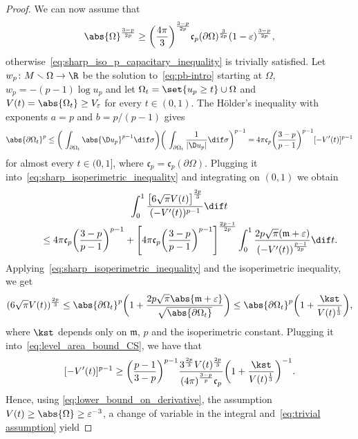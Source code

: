 \documentclass[10pt,a4paper]{amsart}
\numberwithin{equation}{section}
\renewcommand{\ncapa}{\mathfrak{c}}
\newcommand{\ma}{\mathfrak{m}}
\begin{document}
\begin{proof}
We can now assume that
\begin{equation}\label{eq:trivial assumption}
 \abs{\Omega}^{\frac{3-p}{2p}} \geq \bigg(\frac{4 \pi}{3}\bigg)^{\frac{3-p}{2p}}\ncapa_p(\partial \Omega)^{\frac{3}{2p}}(1-\varepsilon)^{\frac{3-p}{2p}},
\end{equation}
otherwise~\eqref{eq:sharp_iso_p_capacitary_inequality} is trivially satisfied. Let $w_p\colon M \smallsetminus \Omega \to \R$ be the solution to~\eqref{eq:pb-intro} starting at $\Omega$, $w_p = -(p-1) \log u_p$ and let $\Omega_t=\set{u_p\geq t}\cup \Omega $ and $V(t)= \abs{ \Omega_t}\geq V_\varepsilon$ for every $t \in (0,1)$. The H\"{o}lder's inequality with exponents $a=p$ and $b=p/(p-1)$ gives
\begin{equation}\label{eq:level_area_bound_CS}
 \abs{ \partial \Omega_t}^p \leq \bigg(\,\int_{ \partial \Omega_t} \abs{\D u_p}^{p-1} \dif \sigma \bigg)\bigg(\, \int_{\partial \Omega_t}\frac{1}{| \D u_p |}\dif \sigma\bigg)^{p-1} = 4\pi \ncapa_p \bigg( \frac{3-p}{p-1}\bigg)^{p-1}[-V'(t)]^{p-1}
\end{equation}
for almost every $t \in (0,1]$, where $\ncapa_p=\ncapa_p(\partial \Omega)$. Plugging it into~\eqref{eq:sharp_isoperimetric_inequality} and integrating on $(0, 1)$ we obtain
\begin{gather}
 \int_0^1\frac{\big[6 \sqrt{\pi}V(t)\big]^{\frac{2p}{3}}}{(-V'(t))^{p-1}}\dif t \nonumber\\
\qquad{} \leq 4\pi \ncapa_p \bigg( \frac{3-p}{p-1}\bigg)^{p-1}+ \Bigg[4\pi\ncapa_p \bigg( \frac{3-p}{p-1}\bigg)^{p-1}\Bigg]^{\frac{2p-1}{2p}} \int_0^1\frac{2p\sqrt{\pi}(\ma+\varepsilon)}{(-V'(t))^{\frac{p-1}{2p}}}\dif t. \label{eq:integration_sharpcap}
\end{gather}
Applying~\eqref{eq:sharp_isoperimetric_inequality} and the isoperimetric inequality, we get
\[
 (6 \sqrt{\pi}V(t))^{\frac{2p}{3}} \leq \abs{\partial \Omega_t}^{p}\bigg(1+ \frac{2p\sqrt{\pi}\abs{\ma+\varepsilon}}{\sqrt{\abs{\partial \Omega_t}}}\bigg)\leq\abs{\partial \Omega_t}^{p}\bigg(1+ \frac{\kst}{V(t)^{\frac{1}{3}}}\bigg),
\]
where $\kst$ depends only on $\ma$, $p$ and the isoperimetric constant. Plugging it into~\eqref{eq:level_area_bound_CS}, we have that
\begin{equation}\label{eq:lower_bound_on_derivative}
 [-V'(t)]^{p-1} \geq \bigg( \frac{p-1}{3-p}\bigg)^{p-1} \frac{3^{\frac{2p}{3}} V(t)^{\frac{2p}{3}}}{(4\pi)^{\frac{3-p}{p}}\ncapa_p}\bigg(1+ \frac{\kst}{V(t)^{\frac{1}{3}}}\bigg)^{-1}.
\end{equation}
 Hence, using \eqref{eq:lower_bound_on_derivative}, the assumption $V(t)\geq \abs{\Omega}\geq \varepsilon^{-3}$, a change of variable in the integral and~\eqref{eq:trivial assumption} yield

\end{proof}
\end{document}
